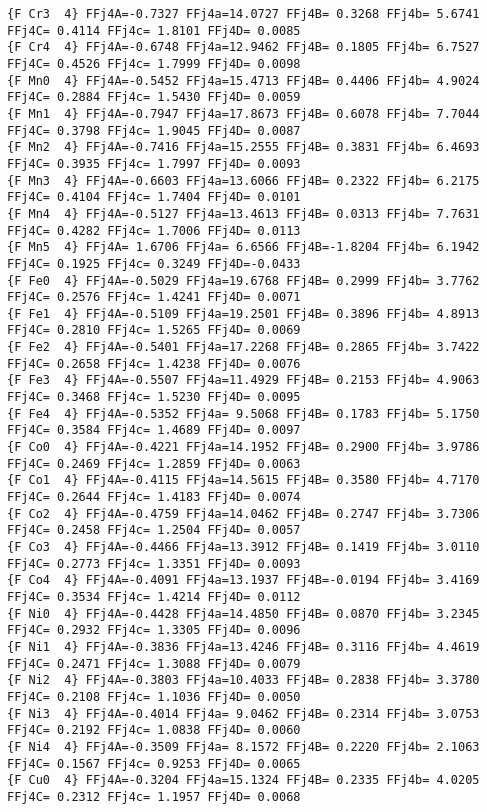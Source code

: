 {\begin{verbatim}
{F Cr3  4} FFj4A=-0.7327 FFj4a=14.0727 FFj4B= 0.3268 FFj4b= 5.6741 FFj4C= 0.4114 FFj4c= 1.8101 FFj4D= 0.0085 
{F Cr4  4} FFj4A=-0.6748 FFj4a=12.9462 FFj4B= 0.1805 FFj4b= 6.7527 FFj4C= 0.4526 FFj4c= 1.7999 FFj4D= 0.0098 
{F Mn0  4} FFj4A=-0.5452 FFj4a=15.4713 FFj4B= 0.4406 FFj4b= 4.9024 FFj4C= 0.2884 FFj4c= 1.5430 FFj4D= 0.0059 
{F Mn1  4} FFj4A=-0.7947 FFj4a=17.8673 FFj4B= 0.6078 FFj4b= 7.7044 FFj4C= 0.3798 FFj4c= 1.9045 FFj4D= 0.0087 
{F Mn2  4} FFj4A=-0.7416 FFj4a=15.2555 FFj4B= 0.3831 FFj4b= 6.4693 FFj4C= 0.3935 FFj4c= 1.7997 FFj4D= 0.0093 
{F Mn3  4} FFj4A=-0.6603 FFj4a=13.6066 FFj4B= 0.2322 FFj4b= 6.2175 FFj4C= 0.4104 FFj4c= 1.7404 FFj4D= 0.0101 
{F Mn4  4} FFj4A=-0.5127 FFj4a=13.4613 FFj4B= 0.0313 FFj4b= 7.7631 FFj4C= 0.4282 FFj4c= 1.7006 FFj4D= 0.0113 
{F Mn5  4} FFj4A= 1.6706 FFj4a= 6.6566 FFj4B=-1.8204 FFj4b= 6.1942 FFj4C= 0.1925 FFj4c= 0.3249 FFj4D=-0.0433 
{F Fe0  4} FFj4A=-0.5029 FFj4a=19.6768 FFj4B= 0.2999 FFj4b= 3.7762 FFj4C= 0.2576 FFj4c= 1.4241 FFj4D= 0.0071 
{F Fe1  4} FFj4A=-0.5109 FFj4a=19.2501 FFj4B= 0.3896 FFj4b= 4.8913 FFj4C= 0.2810 FFj4c= 1.5265 FFj4D= 0.0069 
{F Fe2  4} FFj4A=-0.5401 FFj4a=17.2268 FFj4B= 0.2865 FFj4b= 3.7422 FFj4C= 0.2658 FFj4c= 1.4238 FFj4D= 0.0076 
{F Fe3  4} FFj4A=-0.5507 FFj4a=11.4929 FFj4B= 0.2153 FFj4b= 4.9063 FFj4C= 0.3468 FFj4c= 1.5230 FFj4D= 0.0095 
{F Fe4  4} FFj4A=-0.5352 FFj4a= 9.5068 FFj4B= 0.1783 FFj4b= 5.1750 FFj4C= 0.3584 FFj4c= 1.4689 FFj4D= 0.0097 
{F Co0  4} FFj4A=-0.4221 FFj4a=14.1952 FFj4B= 0.2900 FFj4b= 3.9786 FFj4C= 0.2469 FFj4c= 1.2859 FFj4D= 0.0063 
{F Co1  4} FFj4A=-0.4115 FFj4a=14.5615 FFj4B= 0.3580 FFj4b= 4.7170 FFj4C= 0.2644 FFj4c= 1.4183 FFj4D= 0.0074 
{F Co2  4} FFj4A=-0.4759 FFj4a=14.0462 FFj4B= 0.2747 FFj4b= 3.7306 FFj4C= 0.2458 FFj4c= 1.2504 FFj4D= 0.0057 
{F Co3  4} FFj4A=-0.4466 FFj4a=13.3912 FFj4B= 0.1419 FFj4b= 3.0110 FFj4C= 0.2773 FFj4c= 1.3351 FFj4D= 0.0093 
{F Co4  4} FFj4A=-0.4091 FFj4a=13.1937 FFj4B=-0.0194 FFj4b= 3.4169 FFj4C= 0.3534 FFj4c= 1.4214 FFj4D= 0.0112 
{F Ni0  4} FFj4A=-0.4428 FFj4a=14.4850 FFj4B= 0.0870 FFj4b= 3.2345 FFj4C= 0.2932 FFj4c= 1.3305 FFj4D= 0.0096 
{F Ni1  4} FFj4A=-0.3836 FFj4a=13.4246 FFj4B= 0.3116 FFj4b= 4.4619 FFj4C= 0.2471 FFj4c= 1.3088 FFj4D= 0.0079 
{F Ni2  4} FFj4A=-0.3803 FFj4a=10.4033 FFj4B= 0.2838 FFj4b= 3.3780 FFj4C= 0.2108 FFj4c= 1.1036 FFj4D= 0.0050 
{F Ni3  4} FFj4A=-0.4014 FFj4a= 9.0462 FFj4B= 0.2314 FFj4b= 3.0753 FFj4C= 0.2192 FFj4c= 1.0838 FFj4D= 0.0060 
{F Ni4  4} FFj4A=-0.3509 FFj4a= 8.1572 FFj4B= 0.2220 FFj4b= 2.1063 FFj4C= 0.1567 FFj4c= 0.9253 FFj4D= 0.0065 
{F Cu0  4} FFj4A=-0.3204 FFj4a=15.1324 FFj4B= 0.2335 FFj4b= 4.0205 FFj4C= 0.2312 FFj4c= 1.1957 FFj4D= 0.0068 

\end{verbatim}}
